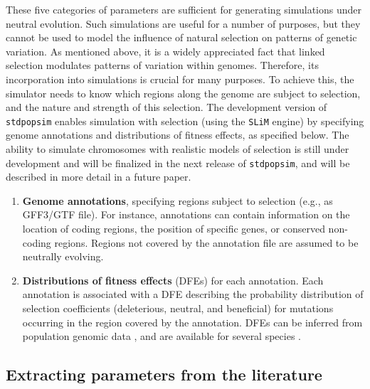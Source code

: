 \documentclass[hidelinks]{article}
\newcommand{\stdpopsim}{\texttt{stdpopsim}\xspace}
\begin{document}
These five categories of parameters are sufficient for generating simulations
under neutral evolution. Such simulations are useful for a number of purposes,
but they cannot be used to model the influence of natural selection on patterns of genetic variation.
As mentioned above, it is a widely appreciated fact that linked selection modulates
patterns of variation within genomes.
Therefore, its incorporation into simulations is crucial for many purposes.
To achieve this, the simulator needs to know which regions along the genome are subject to selection,
and the nature and strength of this selection.
The development version of \stdpopsim enables simulation with selection
(using the \texttt{SLiM} engine)
by specifying genome annotations and distributions of fitness effects,
as specified below.
The ability to simulate chromosomes with realistic models of
selection is still under development and will be finalized in the next release of \stdpopsim,
and will be described in more detail in a future paper.

\begin{enumerate}
	\def\labelenumi{\arabic{enumi}.}
	\setcounter{enumi}{5}
	\item
	\textbf{Genome annotations}, specifying regions subject to selection (e.g., as GFF3/GTF file).
    For instance, annotations can contain information on the location of coding regions,
    the position of specific genes, or conserved non-coding regions.
    Regions not covered by the annotation file are assumed to be neutrally evolving.

	\item
	\textbf{Distributions of fitness effects} (DFEs) for each annotation.
    Each annotation is associated with a DFE describing
    the probability distribution of selection coefficients (deleterious, neutral, and beneficial)
    for mutations occurring in the region covered by the annotation.
    DFEs can be inferred from population genomic data \citep[reviewed in][]{Eyre-Walker2007},
    and are available for several species \citep[e.g.,][]{Ma2013, Huber2018}.
\end{enumerate}

\subsection*{Extracting parameters from the literature}
\end{document}
